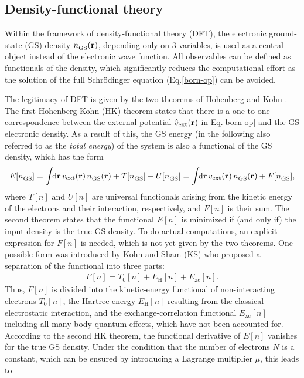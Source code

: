 \subsection{Density-functional theory}
Within the framework of density-functional theory (DFT), the  electronic ground-state (GS) density $ n_\text{GS}^{\phantom{I}}(\mathbf{r})$, depending only on 3 variables, is used as a central object instead of the electronic wave function.  All observables can be defined as functionals of the density, which significantly reduces the computational effort as the solution of the full Schr\"odinger equation (Eq.\;\eqref{born-op}) can be avoided. \par
The legitimacy of DFT is given by the two theorems of Hohenberg and Kohn \cite{hk64}. The first Hohenberg-Kohn (HK) theorem states that there is a one-to-one correspondence between the external potential $\hat{v}_\text{ext}(\mathbf{r})$ in Eq.\;\eqref{born-op} and the GS electronic density. As a result of this, the GS energy (in the following also referred to as the \textit{total energy}) of the system is also a functional of the GS density, which has the form
%
\begin{align}\label{e_func}
    E[n_\text{GS}^{\phantom{I}}] = \int\text{\!\!d}\mathbf{r}\, v_\text{ext}(\mathbf{r})\,n_\text{GS}^{\phantom{I}}(\mathbf{r})  + T[n_\text{GS}^{\phantom{I}}] + U[n_\text{GS}^{\phantom{I}}] = \int\text{\!\!d}\mathbf{r}\,v_\text{ext}(\mathbf{r})\, n_\text{GS}^{\phantom{I}}(\mathbf{r}) + F[n_\text{GS}^{\phantom{I}}],
\end{align}
%
where $T[n]$ and $U[n]$ are universal functionals arising from the kinetic energy of the electrons and their interaction, respectively, and $F[n]$ is their sum. The second theorem states that the functional $E[n]$ is minimized if (and only if) the input density is the true GS density. To do actual computations, an explicit expression for $F[n]$ is needed, which is not yet given by the two theorems. One possible form was introduced by Kohn and Sham (KS)\cite{ks65} who proposed a separation of the functional into three parts:
%
\begin{align}\label{univ_func}
    F[n] = T_0[n] + E_\text{H}[n] + E_\text{xc}[n].
\end{align}
%
Thus, $F[n]$ is divided into the kinetic-energy functional of non-interacting electrons $T_0[n]$, the Hartree-energy $E_\text{H}[n]$ resulting from the  classical electrostatic interaction, and the exchange-correlation functional $E_\text{xc}[n]$ including all many-body quantum effects, which have not been accounted for. According to the second HK theorem, the functional derivative of $E[n]$ vanishes for the true GS density. Under the condition that the number of electrons $N$ is a constant, which can be ensured by introducing a Lagrange multiplier $\mu$, this leads to 
